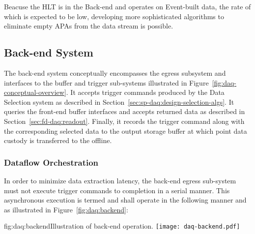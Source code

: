 Beacuse the HLT is in the  Back-end and operates on Event-built data, the rate
of which is expected to be low, developing more sophisticated
algorithms to eliminate empty APAs from the data 
stream is possible.

\subsection{Back-end System}
\label{sec:fd-daq:design-backend}

The  back-end system conceptually encompasses the egress subsystem and interfaces to the buffer and trigger sub-systems illustrated in Figure~\ref{fig:daq-conceptual-overview}. 
It accepts trigger commands produced by the Data Selection system as described in Section~\ref{sec:sp-daq:design-selection-algs}. 
It queries the front-end buffer interfaces and accepts returned data as described in Section~\ref{sec:fd-daq:readout}. 
Finally, it records the trigger command along with the corresponding selected data to the output storage buffer at which point data custody is transferred to the offline.

\subsubsection{Dataflow Orchestration}

In order to minimize data extraction latency, the back-end egress sub-system must not execute trigger commands to completion in a serial manner. 
This asynchronous execution is termed  and shall operate in the following manner and as illustrated in Figure~\ref{fig:daq:backend}:

\begin{dunefigure}{fig:daq:backend}{Illustration of   back-end operation.}
  \texttt{[image: daq-backend.pdf]}
\end{dunefigure}

